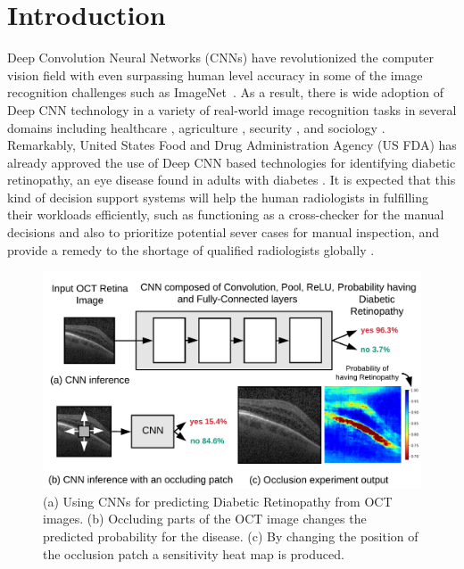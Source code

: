 \section{Introduction}
Deep Convolution Neural Networks (CNNs) \cite{alexnet, vggnet, resnet, inception} have revolutionized the computer vision field with even surpassing human level accuracy in some of the image recognition challenges such as ImageNet~\cite{imagenet}.
As a result, there is wide adoption of Deep CNN technology in a variety of real-world image recognition tasks in several domains including healthcare \cite{kermany2018identifying, islam2017abnormality}, agriculture \cite{mohanty2016using}, security \cite{arbabzadah2016identifying}, and sociology \cite{wang2017deep}.
Remarkably, United States Food and Drug Administration Agency (US FDA) has already approved the use of Deep CNN based technologies for identifying diabetic retinopathy, an eye disease found in adults with diabetes \cite{fdaretinopathy}.
It is expected that this kind of decision support systems will help the human radiologists in fulfilling their workloads efficiently, such as functioning as a cross-checker for the manual decisions and also to prioritize potential sever cases for manual inspection, and provide a remedy to the shortage of qualified radiologists globally \cite{radiologistshortage}.

\begin{figure}[t]
  \includegraphics[width=\columnwidth]{./images/krypton_overview}
  \caption{(a) Using CNNs for predicting Diabetic Retinopathy from OCT images. (b) Occluding parts of the OCT image changes the predicted probability for the disease. (c) By changing the position of the occlusion patch a sensitivity heat map is produced.}
  \label{fig:krypton_overview}
\end{figure}

